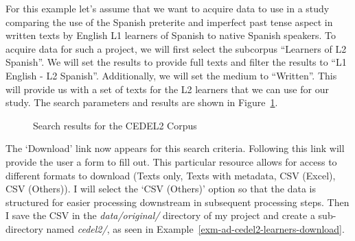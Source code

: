 \documentclass[
  letterpaper,
  DIV=11,
  numbers=noendperiod]{scrreprt}
\theoremstyle{definition}
\theoremstyle{remark}
\begin{document}
For this example let's assume that we want to acquire data to use in a
study comparing the use of the Spanish preterite and imperfect past
tense aspect in written texts by English L1 learners of Spanish to
native Spanish speakers. To acquire data for such a project, we will
first select the subcorpus ``Learners of L2 Spanish''. We will set the
results to provide full texts and filter the results to ``L1 English -
L2 Spanish''. Additionally, we will set the medium to ``Written''. This
will provide us with a set of texts for the L2 learners that we can use
for our study. The search parameters and results are shown in
Figure~\ref{fig-ad-cedel2-results}.

\begin{figure}[H]


\caption{\label{fig-ad-cedel2-results}Search results for the CEDEL2
Corpus}

\end{figure}%

The `Download' link now appears for this search criteria. Following this
link will provide the user a form to fill out. This particular resource
allows for access to different formats to download (Texts only, Texts
with metadata, CSV (Excel), CSV (Others)). I will select the `CSV
(Others)' option so that the data is structured for easier processing
downstream in subsequent processing steps. Then I save the CSV in the
\emph{data/original/} directory of my project and create a sub-directory
named \emph{cedel2/}, as seen in
Example~\ref{exm-ad-cedel2-learners-download}.
\end{document}
